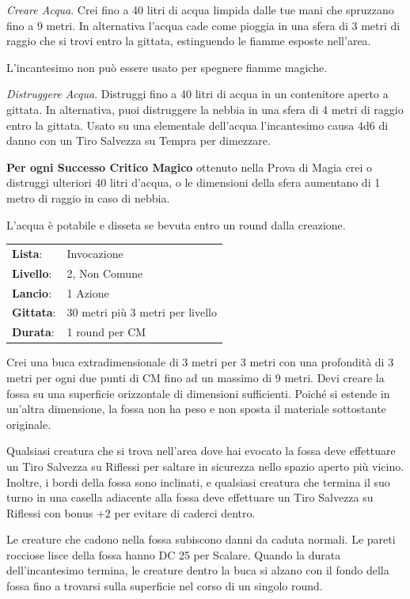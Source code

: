 \begin{multicols}{2}
\emph{Creare Acqua}. Crei fino a 40 litri di acqua limpida dalle tue mani che spruzzano fino a 9 metri. In alternativa l'acqua cade come pioggia in una sfera di 3 metri di raggio che si trovi entro la gittata, estinguendo le fiamme esposte nell'area.

L'incantesimo non può essere usato per spegnere fiamme magiche.

\emph{Distruggere Acqua}. Distruggi fino a 40 litri di acqua in un contenitore aperto a gittata. In alternativa, puoi distruggere la nebbia in una sfera di 4 metri di raggio entro la gittata. Usato su una elementale dell'acqua l'incantesimo causa 4d6 di danno con un Tiro Salvezza su Tempra per dimezzare.

\textbf{Per ogni Successo Critico Magico} ottenuto nella Prova di Magia crei o distruggi ulteriori 40 litri d'acqua, o le dimensioni della sfera aumentano di 1 metro di raggio in caso di nebbia.

L'acqua è potabile e disseta se bevuta entro un round dalla creazione.

\noindent\begin{tabularx}{\linewidth}{p{1.3cm}X}
	\rowcolor{gray!20}\textbf{Lista}: & Invocazione \\
	\textbf{Livello}: & 2, Non Comune \\
	\rowcolor{gray!20}\textbf{Lancio}: & 1 Azione \\
	\textbf{Gittata}: & 30 metri più 3 metri per livello \\
	\rowcolor{gray!20}\textbf{Durata}: & 1 round per CM \\
\end{tabularx}\smallskip

Crei una buca extradimensionale di 3 metri per 3 metri con una profondità di 3 metri per ogni due punti di CM fino ad un massimo di 9 metri. Devi creare la fossa su una superficie orizzontale di dimensioni sufficienti. Poiché si estende in un'altra dimensione, la fossa non ha peso e non sposta il materiale sottostante originale.

Qualsiasi creatura che si trova nell'area dove hai evocato la fossa deve effettuare un Tiro Salvezza su Riflessi per saltare in sicurezza nello spazio aperto più vicino. Inoltre, i bordi della fossa sono inclinati, e qualsiasi creatura che termina il suo turno in una casella adiacente alla fossa deve effettuare un Tiro Salvezza su Riflessi con bonus +2 per evitare di caderci dentro.

Le creature che cadono nella fossa subiscono danni da caduta normali. Le pareti rocciose lisce della fossa hanno DC 25 per Scalare. Quando la durata dell'incantesimo termina, le creature dentro la buca si alzano con il fondo della fossa fino a trovarsi sulla superficie nel corso di un singolo round.


\end{multicols}
